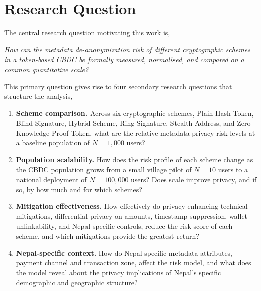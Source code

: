\section{Research Question}
\label{sec:research_question}

The central research question motivating this work is,

\vspace{0.5em}
\begin{center}
\textit{How can the metadata de-anonymization risk of
different cryptographic schemes in a token-based CBDC
be formally measured, normalised, and compared on a
common quantitative scale?}
\end{center}
\vspace{0.5em}

This primary question gives rise to four secondary
research questions that structure the analysis,

\begin{enumerate}

\item \textbf{Scheme comparison.} Across six
cryptographic schemes, Plain Hash Token, Blind
    Signature, Hybrid Scheme, Ring Signature, Stealth
    Address, and Zero-Knowledge Proof Token, what are the relative
    metadata privacy risk levels at a baseline population
    of $N = 1{,}000$ users?

    \item \textbf{Population scalability.} How does the
    risk profile of each scheme change as the CBDC
    population grows from a small village pilot of
    $N = 10$ users to a national deployment of
    $N = 100{,}000$ users? Does scale improve privacy,
    and if so, by how much and for which schemes?

\item \textbf{Mitigation effectiveness.} How
effectively do privacy-enhancing technical
mitigations, differential privacy on amounts,
    timestamp suppression, wallet unlinkability, and
    Nepal-specific controls, reduce the risk score
    of each scheme, and which mitigations provide the
    greatest return?

    \item \textbf{Nepal-specific context.} How do
    Nepal-specific metadata attributes, payment
    channel and transaction zone, affect the risk
    model, and what does the model reveal about the
    privacy implications of Nepal's specific demographic
    and geographic structure?

\end{enumerate}

